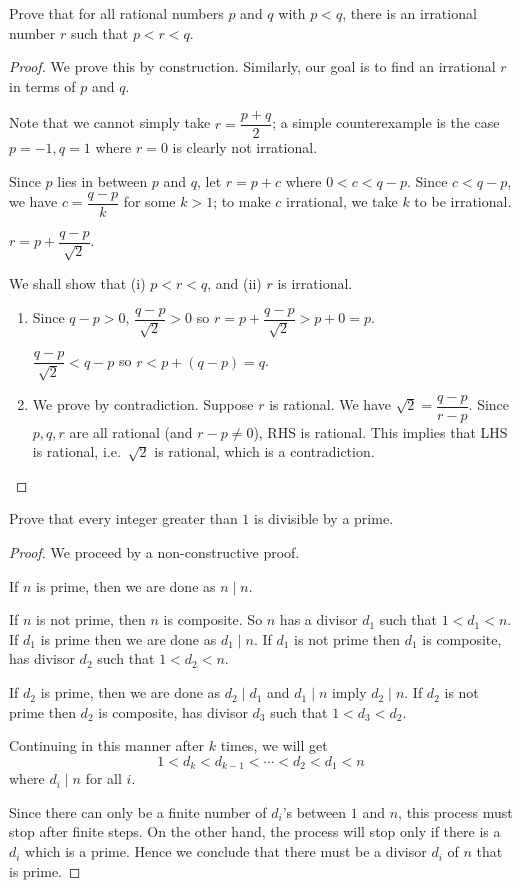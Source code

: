 \begin{example}
Prove that for all rational numbers $p$ and $q$ with $p<q$, there is an irrational number $r$ such that $p<r<q$.
\begin{proof}
We prove this by construction. Similarly, our goal is to find an irrational $r$ in terms of $p$ and $q$.

Note that we cannot simply take $r=\dfrac{p+q}{2}$; a simple counterexample is the case $p=-1,q=1$ where $r=0$ is clearly not irrational.

Since $p$ lies in between $p$ and $q$, let $r=p+c$ where $0<c<q-p$. Since $c<q-p$, we have $c=\dfrac{q-p}{k}$ for some $k>1$; to make $c$ irrational, we take $k$ to be irrational.

\begin{claim}
$r=p+\dfrac{q-p}{\sqrt{2}}$.
\end{claim}

We shall show that (i) $p<r<q$, and (ii) $r$ is irrational.
\begin{enumerate}[label=(\roman*)]
\item Since $q-p>0$, $\dfrac{q-p}{\sqrt{2}}>0$ so $r=p+\dfrac{q-p}{\sqrt{2}}>p+0=p$.

$\dfrac{q-p}{\sqrt{2}}<q-p$ so $r<p+(q-p)=q$.

\item We prove by contradiction. Suppose $r$ is rational. We have $\sqrt{2}=\dfrac{q-p}{r-p}$. Since $p,q,r$ are all rational (and $r-p\neq0$), RHS is rational. This implies that LHS is rational, i.e.\ $\sqrt{2}$ is rational, which is a contradiction.
\end{enumerate}
\end{proof}
\end{example}

\begin{example}
Prove that every integer greater than $1$ is divisible by a prime.

\begin{proof}
We proceed by a non-constructive proof.

If $n$ is prime, then we are done as $n\mid n$.

If $n$ is not prime, then $n$ is composite. So $n$ has a divisor $d_1$ such that $1<d_1<n$. If $d_1$ is prime then we are done as $d_1\mid n$. If $d_1$ is not prime then $d_1$ is composite, has divisor $d_2$ such that $1<d_2<n$.

If $d_2$ is prime, then we are done as $d_2\mid d_1$ and $d_1\mid n$ imply $d_2\mid n$. If $d_2$ is not prime then $d_2$ is composite, has divisor $d_3$ such that $1<d_3<d_2$.

Continuing in this manner after $k$ times, we will get
\[ 1<d_k<d_{k-1}<\cdots<d_2<d_1<n \]
where $d_i\mid n$ for all $i$.

Since there can only be a finite number of $d_i$'s between $1$ and $n$, this process must stop after finite steps. On the other hand, the process will stop only if there is a $d_i$ which is a prime. Hence we conclude that there must be a divisor $d_i$ of $n$ that is prime.
\end{proof}
\end{example}

